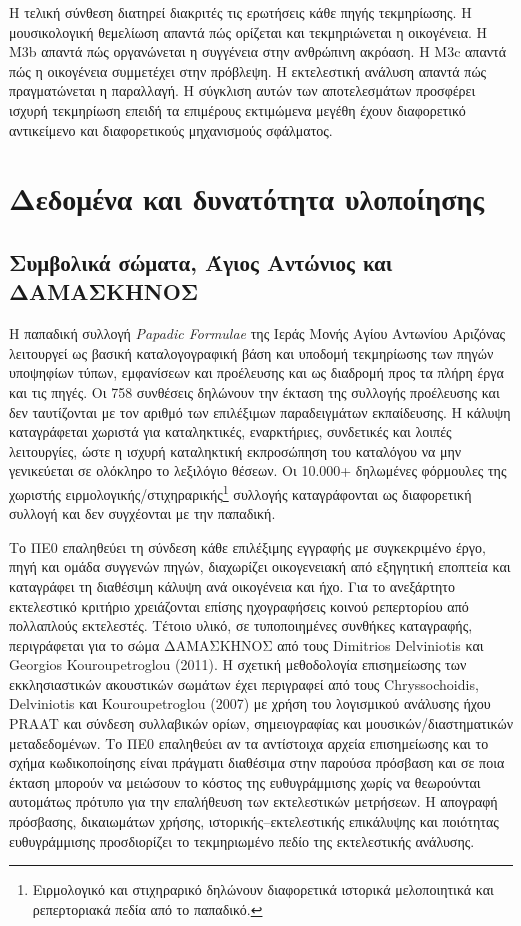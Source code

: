 \documentclass[11pt,a4paper]{article}
\begin{document}
Η τελική σύνθεση διατηρεί διακριτές τις ερωτήσεις κάθε πηγής τεκμηρίωσης. Η μουσικολογική θεμελίωση απαντά πώς ορίζεται και τεκμηριώνεται η οικογένεια. Η M3b απαντά πώς οργανώνεται η συγγένεια στην ανθρώπινη ακρόαση. Η M3c απαντά πώς η οικογένεια συμμετέχει στην πρόβλεψη. Η εκτελεστική ανάλυση απαντά πώς πραγματώνεται η παραλλαγή. Η σύγκλιση αυτών των αποτελεσμάτων προσφέρει ισχυρή τεκμηρίωση επειδή τα επιμέρους εκτιμώμενα μεγέθη έχουν διαφορετικό αντικείμενο και διαφορετικούς μηχανισμούς σφάλματος.

\section{Δεδομένα και δυνατότητα υλοποίησης}

\subsection{Συμβολικά σώματα, Άγιος Αντώνιος και ΔΑΜΑΣΚΗΝΟΣ}\label{sec:training-pool}

Η παπαδική συλλογή \emph{Papadic Formulae} της Ιεράς Μονής Αγίου Αντωνίου Αριζόνας λειτουργεί ως βασική καταλογογραφική βάση και υποδομή τεκμηρίωσης των πηγών υποψηφίων τύπων, εμφανίσεων και προέλευσης και ως διαδρομή προς τα πλήρη έργα και τις πηγές. Οι 758 συνθέσεις δηλώνουν την έκταση της συλλογής προέλευσης και δεν ταυτίζονται με τον αριθμό των επιλέξιμων παραδειγμάτων εκπαίδευσης. Η κάλυψη καταγράφεται χωριστά για καταληκτικές, εναρκτήριες, συνδετικές και λοιπές λειτουργίες, ώστε η ισχυρή καταληκτική εκπροσώπηση του καταλόγου να μην γενικεύεται σε ολόκληρο το λεξιλόγιο θέσεων. Οι 10.000+ δηλωμένες φόρμουλες της χωριστής ειρμολογικής/στιχηραρικής\footnote{Ειρμολογικό και στιχηραρικό δηλώνουν διαφορετικά ιστορικά μελοποιητικά και ρεπερτοριακά πεδία από το παπαδικό.} συλλογής καταγράφονται ως διαφορετική συλλογή και δεν συγχέονται με την παπαδική.

Το ΠΕ0 επαληθεύει τη σύνδεση κάθε επιλέξιμης εγγραφής με συγκεκριμένο έργο, πηγή και ομάδα συγγενών πηγών, διαχωρίζει οικογενειακή από εξηγητική εποπτεία και καταγράφει τη διαθέσιμη κάλυψη ανά οικογένεια και ήχο. Για το ανεξάρτητο εκτελεστικό κριτήριο χρειάζονται επίσης ηχογραφήσεις κοινού ρεπερτορίου από πολλαπλούς εκτελεστές. Τέτοιο υλικό, σε τυποποιημένες συνθήκες καταγραφής, περιγράφεται για το σώμα ΔΑΜΑΣΚΗΝΟΣ από τους Dimitrios Delviniotis και Georgios Kouroupetroglou (2011). Η σχετική μεθοδολογία επισημείωσης των εκκλησιαστικών ακουστικών σωμάτων έχει περιγραφεί από τους Chryssochoidis, Delviniotis και Kouroupetroglou (2007) με χρήση του λογισμικού ανάλυσης ήχου PRAAT και σύνδεση συλλαβικών ορίων, σημειογραφίας και μουσικών/διαστηματικών μεταδεδομένων. Το ΠΕ0 επαληθεύει αν τα αντίστοιχα αρχεία επισημείωσης και το σχήμα κωδικοποίησης είναι πράγματι διαθέσιμα στην παρούσα πρόσβαση και σε ποια έκταση μπορούν να μειώσουν το κόστος της ευθυγράμμισης χωρίς να θεωρούνται αυτομάτως πρότυπο για την επαλήθευση των εκτελεστικών μετρήσεων. Η απογραφή πρόσβασης, δικαιωμάτων χρήσης, ιστορικής--εκτελεστικής επικάλυψης και ποιότητας ευθυγράμμισης προσδιορίζει το τεκμηριωμένο πεδίο της εκτελεστικής ανάλυσης.
\end{document}
